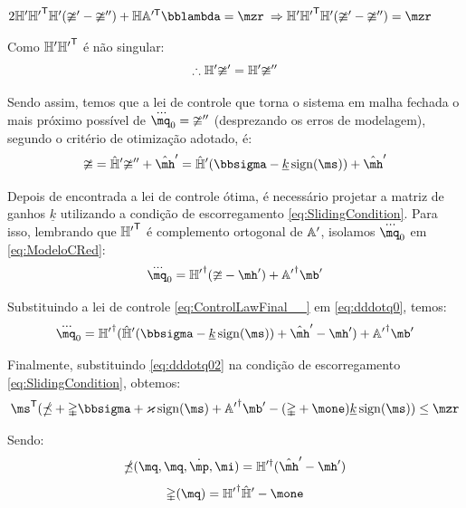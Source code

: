 \documentclass[a4paper,11pt,brazil,fleqn]{article}
\begin{document}
\begin{itemize}
$ 2 \mH' {\mH'}^\msT \mH' (\mup' - \mup'') + \mH \mA'^\msT \mlambda = \mzr $
$ \Rightarrow  \mH' {\mH'}^\msT \mH' (\mup' - \mup'')  = \mzr $

Como $\mathbb{H}' {\mathbb{H}'}^{\mathsf{T}}$ \'e n\~ao singular:
\begin{equation} \label{eq:OptimizationSol2__}
\therefore \mathbb{H}' \mathbb{\upsilon}'  = \mathbb{H}' \mathbb{\upsilon}''
\end{equation}

Sendo assim, temos que a lei de controle que torna o sistema em malha fechada o mais pr\'oximo poss\'ivel de $\dddot{\mq}_0 = \mup''$ (desprezando os erros de modelagem), segundo o crit\'erio de otimiza\c{c}\~ao adotado, \'e:
\begin{equation} \label{eq:ControlLawFinal__}
\mup = \hat{\mH}' \mup'' + \hat{\mh}' = \hat{\mH}'(\msigma - \underline{k} \sign(\ms)) + \hat{\mh}'
\end{equation}

Depois de encontrada a lei de controle \'otima, \'e necess\'ario projetar a matriz de ganhos $\underline{k}$ utilizando a condi\c{c}\~ao de escorregamento \eqref{eq:SlidingCondition}. Para isso, lembrando que ${\mathbb{H}'}^{\mathsf{T}}$ \'e complemento ortogonal de $\mathbb{A}'$, isolamos $\dddot{\mq}_0$ em \eqref{eq:ModeloCRed}:
\begin{equation} \label{eq:dddotq0}
\dddot{\mq}_0 = {\mH'}^\msP (\mup - \mh') + {\mA'}^\msP \mb'
\end{equation}

Substituindo a lei de controle \eqref{eq:ControlLawFinal__} em \eqref{eq:dddotq0}, temos:
\begin{equation} \label{eq:dddotq02}
\dddot{\mq}_0 = {\mH'}^\msP ( \hat{\mH}'(\msigma - \underline{k} \sign(\ms)) + \hat{\mh}' - \mh') + {\mA'}^\msP \mb'
\end{equation}

Finalmente, substituindo \eqref{eq:dddotq02} na condi\c{c}\~ao de escorregamento \eqref{eq:SlidingCondition}, obtemos:
\begin{equation} \label{eq:SlidingConditionRed}
\ms^\msT ( \mdelta + \mDelta \msigma  + \varkappa \sign(\ms) + {\mA'}^\msP \mb' - (\mDelta + \mone) \underline{k} \sign(\ms) ) \leq \mzr
\end{equation}

Sendo:
\begin{equation}
\mdelta(\mq,\mq,\dot{\mp},\mi) = {\mH}'^\msP (\hat{\mh}' - \mh')
\end{equation}
\begin{equation}
\mDelta(\mq) = {\mH'}^\msP \hat{\mH}' - \mone
\end{equation}


\end{itemize}
\end{document}

